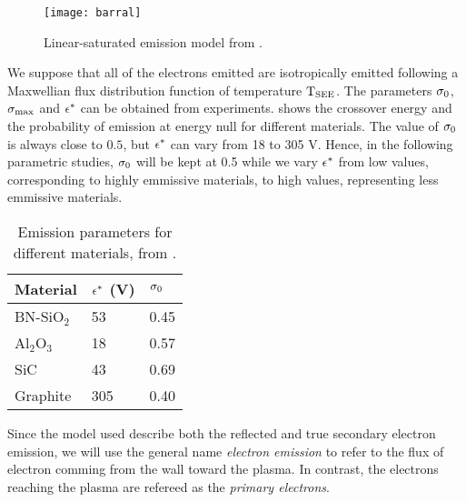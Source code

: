 \begin{figure}[hbtp]
  \centering
  \texttt{[image: barral]}
  \caption{Linear-saturated emission model from \citet{barral2003a}.}
  \label{fig-modelbarral}
\end{figure}

 We suppose that all of the electrons emitted are isotropically emitted following a Maxwellian flux distribution function of temperature $\mathrm{T_{SEE}}$.
 The parameters $\sigma _0$,  $\sigma _{\rm max} $ and $\epsilon^{*}$ can be obtained from experiments. 
  shows the crossover energy and the  probability of emission at energy null for different materials.
 The value of $\sigma _0$ is always close to $0.5$, but $\epsilon^{*}$ can vary from 18 to 305 V.
 Hence, in the following parametric studies, $\sigma _0$ will be kept at 0.5 while we vary $\epsilon^{*}$ from low values, corresponding to highly emmissive materials, to high values, representing less emmissive materials.
 
 \begin{table}[hbtp]
   \centering
   \caption{Emission parameters for different materials, from \citet{barral2003a}.}
   \label{tab-seeparames}
   \begin{tabular}{@{}lll@{}} \toprule
   Material & $\epsilon^{*}$ (V)& $\sigma _0$ \\ \midrule
   BN-SiO$_2$ & 53 & 0.45 \\ 
   Al$_2$O$_3$ & 18  & 0.57 \\ 
   SiC     &  43  &0.69  \\
   Graphite & 305  & 0.40 \\ 
   \bottomrule
   \end{tabular}
 \end{table}
 
 Since the model used describe both the reflected and true secondary electron emission, we will use the general name \emph{electron emission}  to refer to the flux of electron comming from the wall toward the plasma.
 In contrast, the electrons reaching the plasma are refereed as the \emph{primary electrons}.
